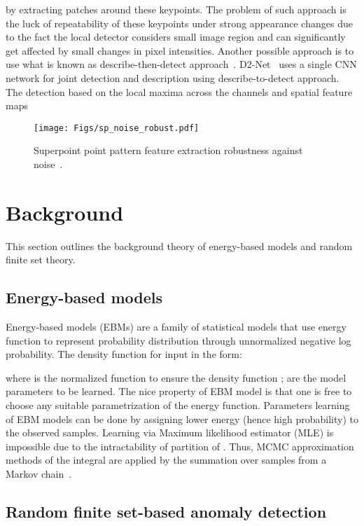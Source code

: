 \documentclass[journal]{IEEEtran}
\let\MYoriglatexcaption\caption
\renewcommand{\caption}[2][\relax]{\MYoriglatexcaption[#2]{#2}}
\begin{document}
by extracting patches around these keypoints. The problem of such approach is the luck of repeatability of these keypoints under strong appearance changes due to the fact the local detector considers small image region and can significantly get affected by small changes in pixel intensities.  Another possible approach is to use what is known as describe-then-detect approach~\cite{tian2020d2d}.  D2-Net~\cite{dusmanu2019d2} uses a single CNN network for joint detection and description using describe-to-detect approach.  The detection based on the local maxima across the channels and spatial feature maps

\begin{figure*}
	
	\texttt{[image: Figs/sp\_noise\_robust.pdf]}
	\caption{Superpoint point pattern feature extraction robustness against noise~\cite{detone2017toward}.}
	\label{Fig:sp_noise}

\end{figure*}

\section{Background}
\label{Sec:background}
This section outlines the background theory of energy-based models and random finite set theory.
\subsection{Energy-based models}
Energy-based models (EBMs) are a family of statistical models that use energy function  to represent probability distribution through unnormalized negative log probability. The density function for input  in the form:

where  is the normalized function to ensure the density function ;  are the model parameters to be learned. The nice property of EBM model is that one is free to choose any suitable parametrization of the energy function. Parameters learning of EBM models can be done by assigning lower energy (hence high probability) to the observed samples. Learning via Maximum likelihood estimator (MLE) is impossible due to the intractability of partition of . Thus, MCMC approximation methods of the integral are applied by the summation over samples from a Markov chain~\cite{zhai2016deep}. 
\subsection{Random finite set-based anomaly detection}
\end{document}
